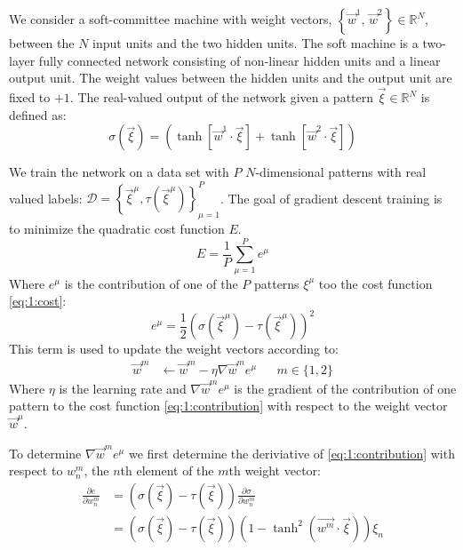 We consider a soft-committee machine with weight vectors, $\left\{\vec{w}^1, \, \vec{w}^2 \right\} \in \mathbb{R}^N$, between the $N$ input units and the two hidden units. The soft machine  is a two-layer fully connected network consisting of non-linear hidden units and a linear output unit. The weight values between the hidden units and the output unit are fixed to $+1$. The real-valued output of the network given a pattern $\vec{\xi} \in \mathbb{R}^N$ is defined as:
\begin{equation}\label{eq:1:sigma}
	\sigma(\vec{\xi}) = \left(\tanh\left[\vec{w}^1 \cdot \vec{\xi}\right] + \tanh\left[\vec{w}^2 \cdot \vec{\xi}\right]\right)
\end{equation}

We train the network on a data set with $P$ $N$-dimensional patterns with real valued labels: ${\mathcal{D} = \left\{ \vec{\xi}^\mu, \tau\left(\vec{\xi}^\mu\right) \right\}_{\mu = 1}^{P}}$. The goal of gradient descent training is to minimize the quadratic cost function $E$. 
\begin{equation}\label{eq:1:cost}
	E = \frac{1}{P} \sum_{\mu = 1}^{P} e^\mu
\end{equation}
Where $e^\mu$ is the contribution of one of the $P$ patterns $\xi^\mu$ too the cost function \eqref{eq:1:cost}:
\begin{equation}\label{eq:1:contribution}
	e^\mu = \frac{1}{2}\left(\sigma\left(\vec{\xi}^\mu\right) - \tau\left(\vec{\xi}^\mu\right)\right)^2
\end{equation}
This term is used to update the weight vectors according to:
\begin{align}\label{eq:1:update}
	\vec{w}^m & \leftarrow \vec{w}^m - \eta \nabla \vec{w}^m e^\mu && m \in \{1, 2\}
\end{align}
Where $\eta$ is the learning rate and $\nabla \vec{w}^m e^\mu$ is the gradient of the contribution of one pattern to the cost function \eqref{eq:1:contribution} with respect to the weight vector $\vec{w}^\mu$. 

To determine $\nabla \vec{w}^m e^\mu$ we first determine the deriviative of \eqref{eq:1:contribution} with respect to $w_n^m$, the $n$th element of the $m$th weight vector:
\begin{align}\label{eq:1:gradient}
	\frac{\partial e}{\partial w_n^m} & = (\sigma(\vec{\xi}) - \tau(\vec{\xi})) \frac{\partial \sigma}{\partial w_n^m} \nonumber \\
	~& = (\sigma(\vec{\xi}) - \tau(\vec{\xi})) (1 - \tanh^2(\vec{w^m} \cdot \vec{\xi})) \xi_n 
\end{align}


